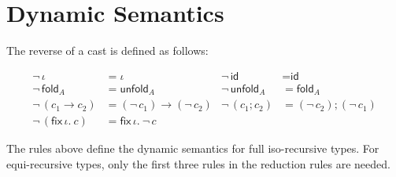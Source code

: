 \documentclass[a4paper]{article}
\newcommand{\cid}{\textsf{id}}
\newcommand{\cfold}[1]{\textsf{fold}_{#1}}
\newcommand{\cunfold}[1]{\textsf{unfold}_{#1}}
\newcommand{\cseq}[2]{#1 ; #2}
\newcommand{\cfix}[2]{\textsf{fix}\,{#1}.~#2}
\begin{document}
\ottdefnseqe

\ottdefnsEquiTyping

\ottdefnsEquiTypingC


\section{Dynamic Semantics}

The reverse of a cast is defined as follows:

$$
\begin{array}{llll}
  \neg\, \iota &= \iota & 
  \neg\, \cid &= \cid \\
  \neg\, \cfold{A} &= \cunfold{A} & 
  \neg\, \cunfold{A} &= \cfold{A} \\
  \neg\, (c_1 \to c_2) &= (\neg\, c_1) \to (\neg\, c_2) & 
  \neg\, (\cseq{c_1}{c_2}) &= \cseq{(\neg\, c_2)}{(\neg\, c_1)} \\
  \neg\, (\cfix{\iota}{c}) &= \cfix{\iota}{\neg\, c}  
\end{array}
$$



\ottdefnsValues


\ottdefnsReduction

The rules above define the dynamic semantics for full iso-recursive types.
For equi-recursive types, only the first three rules in the reduction rules are needed.
\end{document}
